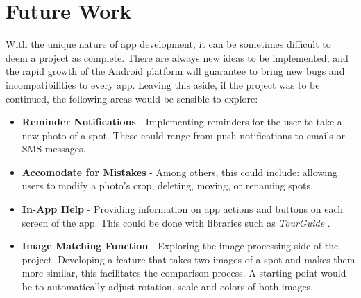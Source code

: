 \section{Future Work}
With the unique nature of app development, it can be sometimes difficult to deem a project as complete. There are always new ideas to be implemented, and the rapid growth of the Android platform will guarantee to bring new bugs and incompatibilities to every app. Leaving this aside, if the project was to be continued, the following areas would be sensible to explore:
\begin{itemize}
    \item \textbf{Reminder Notifications} - Implementing reminders for the user to take a new photo of a spot. These could range from push notifications to emails or SMS messages.
    \item \textbf{Accomodate for Mistakes} - Among others, this could include: allowing users to modify a photo's crop, deleting, moving, or renaming spots.
    \item \textbf{In-App Help} - Providing information on app actions and buttons on each screen of the app. This could be done with libraries such as \emph{TourGuide} \cite{rong_2018}.
    \item \textbf{Image Matching Function} - Exploring the image processing side of the project. Developing a feature that takes two images of a spot and makes them more similar, this facilitates the comparison process. A starting point would be to automatically adjust rotation, scale and colors of both images.
\end{itemize}



